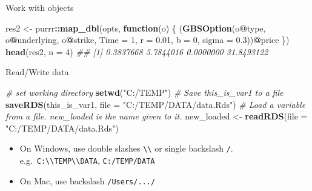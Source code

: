\documentclass[
  10pt,
  ignorenonframetext,
  serif]{beamer}
\newenvironment{Shaded}{\begin{snugshade}}{\end{snugshade}}
\newcommand{\CommentTok}[1]{\textcolor[rgb]{0.56,0.35,0.01}{\textit{#1}}}
\newcommand{\ControlFlowTok}[1]{\textcolor[rgb]{0.13,0.29,0.53}{\textbf{#1}}}
\newcommand{\DataTypeTok}[1]{\textcolor[rgb]{0.13,0.29,0.53}{#1}}
\newcommand{\DecValTok}[1]{\textcolor[rgb]{0.00,0.00,0.81}{#1}}
\newcommand{\FloatTok}[1]{\textcolor[rgb]{0.00,0.00,0.81}{#1}}
\newcommand{\KeywordTok}[1]{\textcolor[rgb]{0.13,0.29,0.53}{\textbf{#1}}}
\newcommand{\NormalTok}[1]{#1}
\newcommand{\OperatorTok}[1]{\textcolor[rgb]{0.81,0.36,0.00}{\textbf{#1}}}
\newcommand{\StringTok}[1]{\textcolor[rgb]{0.31,0.60,0.02}{#1}}
\providecommand{\tightlist}{%
  \setlength{\itemsep}{0pt}\setlength{\parskip}{0pt}}
\begin{document}
\begin{frame}[fragile]{Work with objects}
\begin{Shaded}
\begin{Highlighting}[]
\NormalTok{res2 \textless{}{-}}\StringTok{ }\NormalTok{purrr}\OperatorTok{::}\KeywordTok{map\_dbl}\NormalTok{(opts, }\ControlFlowTok{function}\NormalTok{(o) \{}
\NormalTok{  (}\KeywordTok{GBSOption}\NormalTok{(o}\OperatorTok{@}\NormalTok{type, o}\OperatorTok{@}\NormalTok{underlying, o}\OperatorTok{@}\NormalTok{strike, }\DataTypeTok{Time =} \DecValTok{1}\NormalTok{,}
             \DataTypeTok{r =} \FloatTok{0.01}\NormalTok{, }\DataTypeTok{b =} \DecValTok{0}\NormalTok{, }\DataTypeTok{sigma =} \FloatTok{0.3}\NormalTok{))}\OperatorTok{@}\NormalTok{price}
\NormalTok{\})}
\KeywordTok{head}\NormalTok{(res2, }\DataTypeTok{n =} \DecValTok{4}\NormalTok{)}
\CommentTok{\#\# [1]  0.3837668  5.7844016  0.0000000 31.8493122}
\end{Highlighting}
\end{Shaded}
\end{frame}

\begin{frame}[fragile]{Read/Write data}
\protect\hypertarget{readwrite-data}{}
\begin{Shaded}
\begin{Highlighting}[]
\CommentTok{\# set working directory}
\KeywordTok{setwd}\NormalTok{(}\StringTok{"C:/TEMP"}\NormalTok{)}
\CommentTok{\# Save this\_is\_var1 to a file}
\KeywordTok{saveRDS}\NormalTok{(this\_is\_var1, }\DataTypeTok{file =} \StringTok{"C:/TEMP/DATA/data.Rds"}\NormalTok{)}
\CommentTok{\# Load a variable from a file. \textasciigrave{}new\_loaded\textasciigrave{} is the name given to it.}
\NormalTok{new\_loaded \textless{}{-}}\StringTok{ }\KeywordTok{readRDS}\NormalTok{(}\DataTypeTok{file =} \StringTok{"C:/TEMP/DATA/data.Rds"}\NormalTok{)}
\end{Highlighting}
\end{Shaded}

\begin{itemize}
\tightlist
\item
  On Windows, use double slashes
  \texttt{\textbackslash{}\textbackslash{}} or single backslash
  \texttt{/}.
  e.g.~\texttt{C:\textbackslash{}\textbackslash{}TEMP\textbackslash{}\textbackslash{}DATA},
  \texttt{C:/TEMP/DATA}
\item
  On Mac, use backslash \texttt{/Users/.../}
\end{itemize}
\end{frame}
\end{document}
